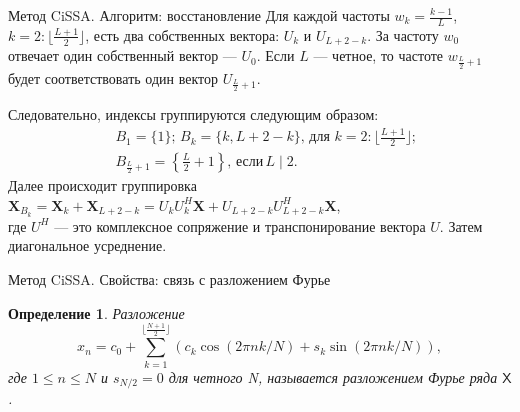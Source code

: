 \documentclass[notheorems, handout]{beamer}
\newtheorem{comment}{Замечание} %
\newtheorem{definition}{Определение}
\newcommand{\TS}{\mathsf{X}}
\begin{document}
	\begin{frame}{Метод CiSSA. Алгоритм: восстановление}
		Для каждой частоты $w_k = \frac{k-1}{L}$, $k = 2:\lfloor \frac{L+1}{2} \rfloor$, есть два собственных вектора: $U_k$ и $U_{L+2-k}$. За частоту $w_0$ отвечает один собственный вектор --- $U_0$. Если $L$ --- четное, то частоте $w_{\frac{L}{2} + 1}$ будет соответствовать один вектор $U_{\frac{L}{2}+1}$.
		
		Следовательно, индексы группируются следующим образом:
		\begin{equation*}
			\begin{split}
				&B_1 = \{1\}; \, B_k = \{k, L+2-k\}, \,  \text{для } k = 2:\lfloor \frac{L+1}{2}\rfloor; \\ \, 
				&B_{\frac{L}{2} + 1} = \left\{ \frac{L}{2} + 1 \right\}, \, \text{если} \, L \mid  2.
			\end{split}
		\end{equation*}
		Далее происходит группировка $\mathbf X_{B_k} = \mathbf X_k + \mathbf X_{L+2-k} = U_k U_k^H \mathbf X + U_{L+2-k} U_{L+2-k}^H \mathbf X$, \\где $U^H$ --- это комплексное сопряжение и транспонирование вектора $U$. Затем диагональное усреднение.
		
		
	\end{frame}
	
	
	
	\begin{frame}{Метод CiSSA. Свойства: связь с разложением Фурье}
		\begin{definition}
			Разложение
			\begin{equation}
				\label{eq:fourier}
				x_n = c_0 + \sum\limits_{k = 1}^{\lfloor \frac{N+1}{2} \rfloor}\left(c_k \cos(2\pi n k / N) + s_k \sin(2\pi n k / N) \right),
			\end{equation}
			где $1 \leq n \leq N$ и $s_{N/2} = 0 $ для четного N, называется разложением Фурье ряда $\TS$. 
		\end{definition}

		
	\end{frame}
	
\end{document}
